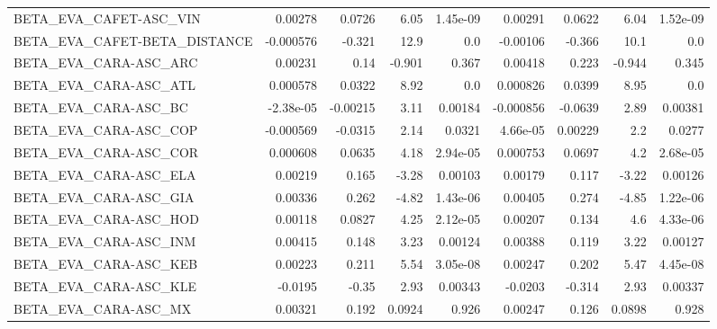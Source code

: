 \begin{tabular}{lrrrrrrrr}
BETA\_EVA\_CAFET-ASC\_VIN                 &     0.00278 &       0.0726 &    6.05 & 1.45e-09 &    0.00291 &      0.0622 &         6.04 &      1.52e-09 \\
BETA\_EVA\_CAFET-BETA\_DISTANCE           &   -0.000576 &       -0.321 &    12.9 &      0.0 &   -0.00106 &      -0.366 &         10.1 &           0.0 \\
BETA\_EVA\_CARA-ASC\_ARC                  &     0.00231 &         0.14 &  -0.901 &    0.367 &    0.00418 &       0.223 &       -0.944 &         0.345 \\
BETA\_EVA\_CARA-ASC\_ATL                  &    0.000578 &       0.0322 &    8.92 &      0.0 &   0.000826 &      0.0399 &         8.95 &           0.0 \\
BETA\_EVA\_CARA-ASC\_BC                   &   -2.38e-05 &     -0.00215 &    3.11 &  0.00184 &  -0.000856 &     -0.0639 &         2.89 &       0.00381 \\
BETA\_EVA\_CARA-ASC\_COP                  &   -0.000569 &      -0.0315 &    2.14 &   0.0321 &   4.66e-05 &     0.00229 &          2.2 &        0.0277 \\
BETA\_EVA\_CARA-ASC\_COR                  &    0.000608 &       0.0635 &    4.18 & 2.94e-05 &   0.000753 &      0.0697 &          4.2 &      2.68e-05 \\
BETA\_EVA\_CARA-ASC\_ELA                  &     0.00219 &        0.165 &   -3.28 &  0.00103 &    0.00179 &       0.117 &        -3.22 &       0.00126 \\
BETA\_EVA\_CARA-ASC\_GIA                  &     0.00336 &        0.262 &   -4.82 & 1.43e-06 &    0.00405 &       0.274 &        -4.85 &      1.22e-06 \\
BETA\_EVA\_CARA-ASC\_HOD                  &     0.00118 &       0.0827 &    4.25 & 2.12e-05 &    0.00207 &       0.134 &          4.6 &      4.33e-06 \\
BETA\_EVA\_CARA-ASC\_INM                  &     0.00415 &        0.148 &    3.23 &  0.00124 &    0.00388 &       0.119 &         3.22 &       0.00127 \\
BETA\_EVA\_CARA-ASC\_KEB                  &     0.00223 &        0.211 &    5.54 & 3.05e-08 &    0.00247 &       0.202 &         5.47 &      4.45e-08 \\
BETA\_EVA\_CARA-ASC\_KLE                  &     -0.0195 &        -0.35 &    2.93 &  0.00343 &    -0.0203 &      -0.314 &         2.93 &       0.00337 \\
BETA\_EVA\_CARA-ASC\_MX                   &     0.00321 &        0.192 &  0.0924 &    0.926 &    0.00247 &       0.126 &       0.0898 &         0.928 \\

\end{tabular}

